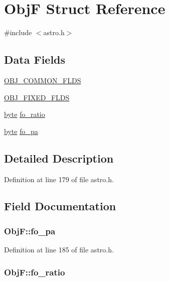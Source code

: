 \hypertarget{struct_obj_f}{\section{Obj\-F Struct Reference}
\label{struct_obj_f}
}


{\ttfamily \#include $<$astro.\-h$>$}

\subsection*{Data Fields}
\begin{DoxyCompactItemize}
\item 
\hyperlink{struct_obj_f_ac06485a349b8c66de064f281140c3741}{O\-B\-J\-\_\-\-C\-O\-M\-M\-O\-N\-\_\-\-F\-L\-D\-S}
\item 
\hyperlink{struct_obj_f_a97411dd8e4c88e38ef9dd489836fe350}{O\-B\-J\-\_\-\-F\-I\-X\-E\-D\-\_\-\-F\-L\-D\-S}
\item 
\hyperlink{astro_8h_a0c8186d9b9b7880309c27230bbb5e69d}{byte} \hyperlink{struct_obj_f_a6411aff1d47e8f79b1b933e83925a249}{fo\-\_\-ratio}
\item 
\hyperlink{astro_8h_a0c8186d9b9b7880309c27230bbb5e69d}{byte} \hyperlink{struct_obj_f_a2b8b41f2c66491d316082f89072bc015}{fo\-\_\-pa}
\end{DoxyCompactItemize}


\subsection{Detailed Description}


Definition at line 179 of file astro.\-h.



\subsection{Field Documentation}
\hypertarget{struct_obj_f_a2b8b41f2c66491d316082f89072bc015}{
\subsubsection[{fo\-\_\-pa}]{ Obj\-F\-::fo\-\_\-pa}}\label{struct_obj_f_a2b8b41f2c66491d316082f89072bc015}


Definition at line 185 of file astro.\-h.

\hypertarget{struct_obj_f_a6411aff1d47e8f79b1b933e83925a249}{
\subsubsection[{fo\-\_\-ratio}]{ Obj\-F\-::fo\-\_\-ratio}}\label{struct_obj_f_a6411aff1d47e8f79b1b933e83925a249}


